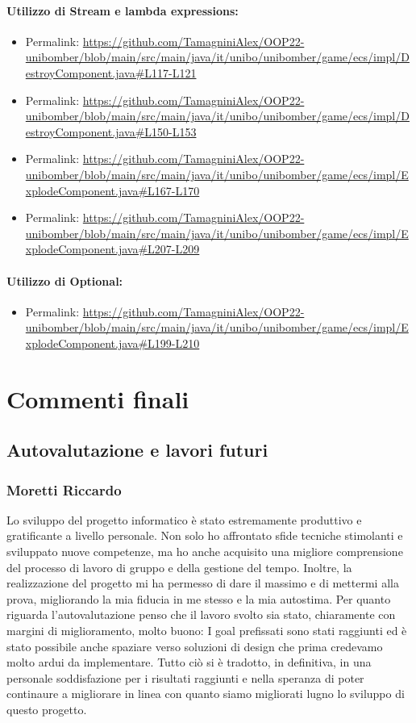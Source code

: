\documentclass[a4paper,12pt]{report}
\begin{document}
\subsubsection*{Utilizzo di Stream e lambda expressions:}
\begin{itemize}
    \item Permalink: \url{https://github.com/TamagniniAlex/OOP22-unibomber/blob/main/src/main/java/it/unibo/unibomber/game/ecs/impl/DestroyComponent.java#L117-L121}
    \item Permalink: \url{https://github.com/TamagniniAlex/OOP22-unibomber/blob/main/src/main/java/it/unibo/unibomber/game/ecs/impl/DestroyComponent.java#L150-L153}
    \item Permalink: \url{https://github.com/TamagniniAlex/OOP22-unibomber/blob/main/src/main/java/it/unibo/unibomber/game/ecs/impl/ExplodeComponent.java#L167-L170}
    \item Permalink: \url{https://github.com/TamagniniAlex/OOP22-unibomber/blob/main/src/main/java/it/unibo/unibomber/game/ecs/impl/ExplodeComponent.java#L207-L209}
\end{itemize}
\subsubsection*{Utilizzo di Optional:}
\begin{itemize}
    \item Permalink: \url{https://github.com/TamagniniAlex/OOP22-unibomber/blob/main/src/main/java/it/unibo/unibomber/game/ecs/impl/ExplodeComponent.java#L199-L210}
\end{itemize}

\chapter{Commenti finali}

\section{Autovalutazione e lavori futuri}
\subsection*{Moretti Riccardo}
Lo sviluppo del progetto informatico è stato estremamente produttivo e gratificante a livello personale. Non solo ho affrontato sfide tecniche stimolanti e sviluppato nuove competenze, ma ho anche acquisito una migliore comprensione del processo di lavoro di gruppo e della gestione del tempo. 
Inoltre, la realizzazione del progetto mi ha permesso di dare il massimo e di mettermi alla prova, migliorando la mia fiducia in me stesso e la mia autostima. 
Per quanto riguarda l'autovalutazione penso che il lavoro svolto sia stato, chiaramente con margini di miglioramento, molto buono: I goal prefissati sono stati raggiunti ed è stato possibile anche spaziare verso soluzioni di design che prima credevamo molto ardui da implementare.
Tutto ciò si è tradotto, in definitiva, in una personale soddisfazione per i risultati raggiunti e nella speranza di poter continaure a migliorare in linea con quanto siamo migliorati lugno lo sviluppo di questo progetto.
\end{document}
